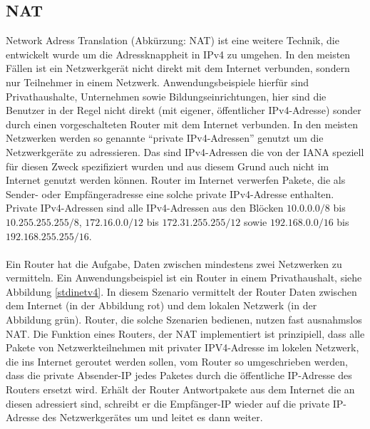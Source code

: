 \documentclass[a4paper,12pt]{scrartcl}
\begin{document}
\subsection{NAT}
Network Adress Translation (Abk\"urzung: NAT)\cite{RFC1631} ist eine weitere Technik, die entwickelt wurde um die Adressknappheit in IPv4 zu umgehen. In den meisten F\"allen ist ein Netzwerkger\"at nicht direkt mit dem Internet verbunden, sondern nur Teilnehmer in einem Netzwerk. Anwendungsbeispiele hierfür sind Privathaushalte, Unternehmen sowie Bildungseinrichtungen, hier sind die Benutzer in der Regel nicht direkt (mit eigener, öffentlicher IPv4-Adresse) sonder durch einen vorgeschalteten Router mit dem Internet verbunden. In den meisten Netzwerken werden so genannte "`private IPv4-Adressen"' genutzt um die Netzwerkger\"ate zu adressieren. Das sind IPv4-Adressen die von der IANA speziell f\"ur diesen Zweck spezifiziert wurden und aus diesem Grund auch nicht im Internet genutzt werden k\"onnen. Router im Internet verwerfen Pakete, die als Sender- oder Empf\"angeradresse eine solche private IPv4-Adresse enthalten. Private IPv4-Adressen sind alle IPv4-Adressen aus den Bl\"ocken $10.0.0.0/8$ bis $10.255.255.255/8$, $172.16.0.0/12$ bis $172.31.255.255/12$ sowie $192.168.0.0/16$ bis $192.168.255.255/16$. \\
\\
Ein Router hat die Aufgabe, Daten zwischen mindestens zwei Netzwerken zu vermitteln. Ein Anwendungsbeispiel ist ein Router in einem Privathaushalt, siehe Abbildung \ref{stdinetv4}. In diesem Szenario vermittelt der Router Daten zwischen dem Internet (in der Abbildung rot) und dem lokalen Netzwerk (in der Abbildung grün). Router, die solche Szenarien bedienen, nutzen fast ausnahmslos NAT.
Die Funktion eines Routers, der NAT implementiert ist prinzipiell, dass alle Pakete von Netzwerkteilnehmen mit privater IPV4-Adresse im lokelen Netzwerk, die ins Internet geroutet werden sollen, vom Router so umgeschrieben werden, dass die private Absender-IP jedes Paketes durch die \"offentliche IP-Adresse des Routers ersetzt wird. Erh\"alt der Router Antwortpakete aus dem Internet die an diesen adressiert sind, schreibt er die Empf\"anger-IP wieder auf die private IP-Adresse des Netzwerkger\"ates um und leitet es dann weiter.
\end{document}
